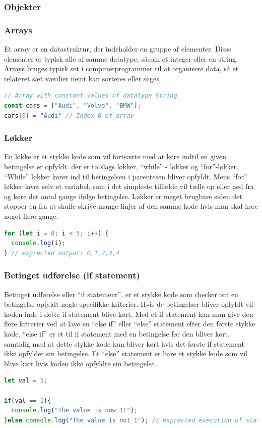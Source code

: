 \documentclass[12pt]{article}
\begin{document}
\subsubsection{Objekter}

\subsubsection{Arrays}
Et array er en datastruktur, der indeholder en gruppe af elementer. Disse elementer er typisk alle af samme datatype, såsom et integer eller en string. Arrays bruges typisk set i computerprogrammer til at organisere data, så et relateret sæt værdier nemt kan sorteres eller søges.
\begin{lstlisting}[language=JavaScript, caption=Eksempel på et array]
// Array with constant values of datatype String
const cars = ["Audi", "Volvo", "BMW"];
cars[0] = "Audi" // Index 0 of array
\end{lstlisting}

\subsubsection{Løkker}
En løkke er et stykke kode som vil fortsætte med at køre indtil en given betingelse er opfyldt. der er to slags løkker, “while” - løkker og “for”-løkker. “While” løkker kører ind til betingelsen i parentesen bliver opfyldt. Mens “for” løkker lavet selv et variabel, som i det simpleste tilfælde vil tælle op eller ned fra og køre det antal gange ifølge betingelse. Løkker er meget brugbare siden det stopper en fra at skulle skrive mange linjer af den samme kode hvis man skal køre noget flere gange.
\begin{lstlisting}[language=JavaScript, caption=Eksempel på et for løkke]
for (let i = 0; i < 5; i++) {
  console.log(i);
} // exprected output: 0,1,2,3,4
\end{lstlisting}

\subsubsection{Betinget udførelse (if statement)}
Betinget udførelse eller “if statement”, er et stykke kode som checker om en betingelse opfyldt nogle specifikke kriterier. Hvis de betingelser bliver opfyldt vil koden inde i dette if statement blive kørt. Med et if statement kan man give den flere kriterier ved at lave en “else if” eller “else” statement efter den første stykke kode. “else if” er et til if statement med en betingelse før den bliver kørt, samtidig med at dette stykke kode kun bliver kørt hvis det første if statement ikke opfylder sin betingelse. Et “else” statement er bare et stykke kode som vil blive kørt hvis koden ikke opfyldte sin betingelse.
\begin{lstlisting}[language=JavaScript, caption=Eksempel på betinget udførelse]
let val = 5; 

if(val == 1){
  console.log("The value is now 1!");
}else console.log("The value is not 1"); // exprected execution of statement
\end{lstlisting}
\end{document}
